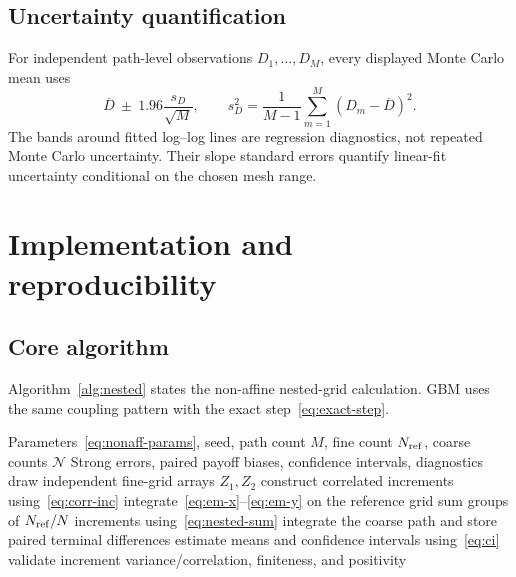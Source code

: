 \documentclass[11pt,a4paper]{article}
\theoremstyle{definition}
\theoremstyle{remark}
\begin{document}
\subsection{Uncertainty quantification}
For independent path-level observations $D_1,\ldots,D_M$, every displayed
Monte Carlo mean uses
\begin{equation}
 \overline D\ \pm\ 1.96\frac{s_D}{\sqrt M},
 \qquad
 s_D^2=\frac{1}{M-1}\sum_{m=1}^{M}(D_m-\overline D)^2.
 \label{eq:ci}
\end{equation}
The bands around fitted log--log lines are regression diagnostics, not repeated
Monte Carlo uncertainty.  Their slope standard errors quantify linear-fit
uncertainty conditional on the chosen mesh range.

\section{Implementation and reproducibility}\label{sec:implementation}

\subsection{Core algorithm}
Algorithm~\ref{alg:nested} states the non-affine nested-grid calculation.  GBM
uses the same coupling pattern with the exact step~\eqref{eq:exact-step}.

\begin{algorithm}[H]
\caption{Coupled non-affine EM convergence experiment}
\label{alg:nested}
\begin{algorithmic}[1]
\Require Parameters~\eqref{eq:nonaff-params}, seed, path count $M$, fine count
$N_{\rm ref}$, coarse counts $\mathcal N$
\Ensure Strong errors, paired payoff biases, confidence intervals, diagnostics
  \State draw independent fine-grid arrays $Z_1,Z_2$
  \State construct correlated increments using~\eqref{eq:corr-inc}
  \State integrate~\eqref{eq:em-x}--\eqref{eq:em-y} on the reference grid
    \State sum groups of $N_{\rm ref}/N$ increments using~\eqref{eq:nested-sum}
    \State integrate the coarse path and store paired terminal differences
  \EndFor
\EndFor
\State estimate means and confidence intervals using~\eqref{eq:ci}
\State validate increment variance/correlation, finiteness, and positivity
\end{algorithmic}
\end{algorithm}
\end{document}
